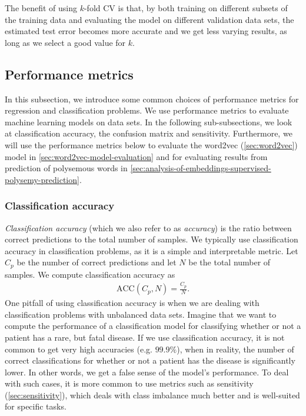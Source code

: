The benefit of using $k$-fold CV is that, by both training on different subsets of the training data and evaluating the model on different validation data sets, the estimated test error becomes more accurate and we get less varying results, as long as we select a good value for $k$.

\subsection{Performance metrics}
\label{sec:performance-metrics}
In this subsection, we introduce some common choices of performance metrics for regression and classification problems. We use performance metrics to evaluate machine learning models on data sets. In the following sub-subsections, we look at classification accuracy, the confusion matrix and sensitivity. Furthermore, we will use the performance metrics below to evaluate the word2vec (\cref{sec:word2vec}) model in \cref{sec:word2vec-model-evaluation} and for evaluating results from prediction of polysemous words in \cref{sec:analysis-of-embeddings-supervised-polysemy-prediction}.

\subsubsection{Classification accuracy}
\label{sec:classification-accuracy}
\textit{Classification accuracy} (which we also refer to as \textit{accuracy}) is the ratio between correct predictions to the total number of samples. We typically use classification accuracy in classification problems, as it is a simple and interpretable metric. Let $C_p$ be the number of correct predictions and let $N$ be the total number of samples. We compute classification accuracy as
\begin{align}
    \text{ACC}(C_p, N) = \frac{C_p}{N}.
    \label{eqn:classification-accuracy}
\end{align}
One pitfall of using classification accuracy is when we are dealing with classification problems with unbalanced data sets. Imagine that we want to compute the performance of a classification model for classifying whether or not a patient has a rare, but fatal disease. If we use classification accuracy, it is not common to get very high accuracies (e.g. $99.9\%$), when in reality, the number of correct classifications for whether or not a patient has the disease is significantly lower. In other words, we get a false sense of the model's performance. To deal with such cases, it is more common to use metrics such as sensitivity (\cref{sec:sensitivity}), which deals with class imbalance much better and is well-suited for specific tasks.


